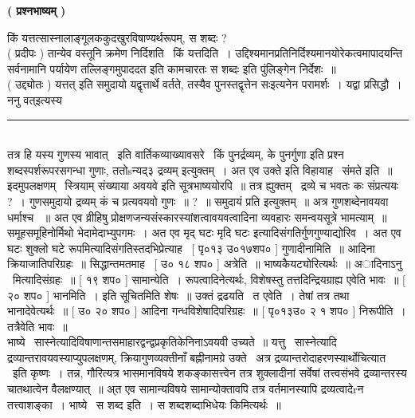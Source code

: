 \documentclass[11pt, openany]{book}
\begin{document}
\begin{multicols}{2}
\begin{center}
\textbf{ ( प्रश्नभाष्यम् ) }
\end{center}

किं यत्तत्सास्नालाङ्गूलककुदखुरविषाण्यर्थरूपम्, स शब्दः ?\\

 ( प्रदीपः ) तान्येव वस्तूनि क्रमेण निर्दिशति \textendash\ किं यत्तदिति~। उद्दिश्यमानप्रतिनिर्दिश्यमानयोरेकत्वमापादयन्ति सर्वनामानि पर्यायेण तल्लिङ्गमुपाददत इति कामचारतः स शब्दः इति पुंलिङ्गेन निर्देशः~॥\\

 ( उद्द्योतः ) यत्तत् इति समुदायो यद्वृत्तार्थे वर्तते, तस्यैव पुनस्तद्वृत्तेन सःइत्यनेन परामर्शः~। यद्वा प्रसिद्धौ~। ननु {\qt वत्}इत्यस्य

\noindent
\rule{1\linewidth}{0.5pt}\\

\noindent
तत्र हि यस्य गुणस्य भावात् \textendash\ इति वार्तिकव्याख्यावसरे \textendash\ किं पुनर्द्रव्यम्, के पुनर्गुणा इति प्रश्न शब्दस्पर्शरूपरसगन्धा गुणाः, ततोsन्यद्३ द्रव्यम् इत्युक्तम्~। अत एव उक्ते इति विहायाह \textendash\ संमते इति~॥ इदमुपलक्षणम् \textendash\ {\qt }स्त्रियाम् संख्याया अवयवे इति सूत्रभाष्ययोरपि~॥ तत्र ह्युक्तम् \textendash\ {\qt द्रव्ये च भवतः कः संप्रत्ययः ?~। गुणसमुदायो द्रव्यम्} {\qt कं च प्रत्यवयवो गुणः~॥ ?~॥ समुदायं प्रति} इत्युक्तम्~॥ अत्र गुणशब्देनावयवा धर्माश्च ~॥ अत एव व्रीहिषु प्रोक्षणजन्यसंस्कारस्यांशत्वावयवत्वादिना व्यवहारः समन्वयसूत्रे भामत्याम्~॥ समूहसमूहिनोर्मिथो भेदामेदाभ्युपगमः~। अत एव {\qt मृद् घटः मृदि घटः इत्यादिसंगतिर्गुणगुण्याद्योरिव~।} अत एव घटः शुक्लो घटे रूपमित्यादिसंगतिस्तदभिप्रेत्याह \textendash\ [ पृ०१३ उ०१७शप० ] गुणादीनामिति~॥ आदिना क्रियाजातिपरिग्रहः~॥ सिद्धान्तमतमाह \textendash\ [ उ० १८ शप० ] अत्रेति~॥ भाष्यकैयट्योरित्यर्थः~॥ अादिनाऽनु \textendash\ मित्यादिसंग्रहः~॥ [ १९ शप० ] सामान्येति~। रूपत्वादिनेत्यर्थः, विशेषस्तु तत्तदिन्द्रियग्राह्य एवेति भावः~॥ [ २० शप० ] भानमिति~। इति सूचितमिति शेषः~॥ उक्तं द्रढयति \textendash\ त एवेति~। तेषां तत्र तथा भानादेवेत्यर्थः~॥ [ उ० २० शप० ] आदिना गन्धविशेषादिपरिग्रहः~॥ [ पृ०१३उ० २ १ शप० ] निरूपीति~। तत्रैवेति भावः~॥\\

भाष्ये \textendash\ सास्नेत्यादिविषाणान्तसमाहारद्वन्द्वप्रकृतिकेनिनाऽवयवी उच्यते~॥ यत्तु \textendash\ सास्नेत्यादि द्रव्यान्तरावयवस्याप्युपलक्षणम्, क्रियागुणव्यक्तीनाँ बह्नीनामग्रे उक्ते \textendash\ अत्र द्रव्यान्तरोदाहरणस्यार्थोचित्यात \textendash\ इति कृष्णः~। तन्न, गौरित्यत्र भासमानविषये शकङ्कासत्त्वेन तत्र शुक्लादीनां सर्वेषां तत्त्वसंभवे द्रव्यान्तरस्य चातथात्वेन वैलक्षण्यात्~॥ अ्त एव सामान्यविषये सामान्योक्तावपि तत्र वर्तमानस्यापि द्रव्यत्वादेrन तत्त्वाशङ्का~। भाष्ये \textendash\ स शब्द इति~। स शब्दशब्दाभिधेयः किमित्यर्थः~॥\\


\end{multicols}
\end{document}
